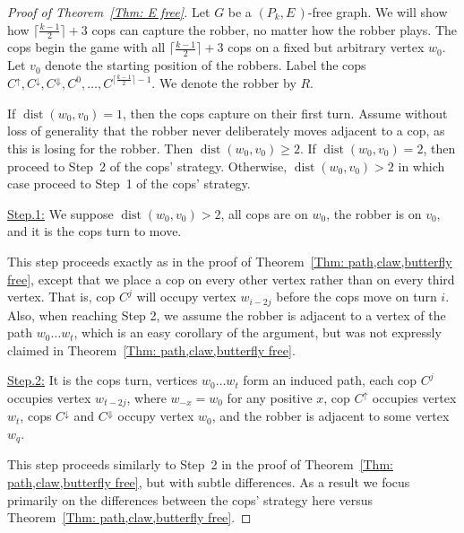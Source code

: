 \documentclass[12pt]{article}
\theoremstyle{definition}
\def\E{\textit{E}}
\DeclareMathOperator{\dist}{dist}
\begin{document}
\begin{proof}[Proof of Theorem~\ref{Thm: E free}]

Let $G$ be a $(P_k,\E\,)$-free graph.
We will show how  $\lceil\frac{k-1}{2}\rceil+3$ cops can capture the robber, no matter how the robber plays.
The cops begin the game with all $\lceil\frac{k-1}{2}\rceil+3$ cops on a fixed but arbitrary vertex $w_0$.
Let $v_0$ denote the starting position of the robbers.
Label the cops $C^\uparrow,C^\downarrow, C^\Downarrow, C^0,\dots, C^{\lceil\frac{k-1}{2}\rceil-1}$.
We denote the robber by $R$.

If $\dist(w_0,v_0) = 1$, then the cops capture on their first turn.
Assume without loss of generality that the robber never deliberately moves adjacent to a cop, as this is losing for the robber.
Then $\dist(w_0,v_0)\geq 2$.
If $\dist(w_0,v_0) = 2$, then proceed to Step~2 of the cops' strategy.
Otherwise, $\dist(w_0,v_0) > 2$ in which case proceed to Step~1 of the cops' strategy.

\vspace{0.25cm}
\noindent\underline{Step.1:} We suppose $\dist(w_0,v_0) > 2$, all cops are on $w_0$, the robber is on $v_0$, and it is the cops turn to move.
\vspace{0.25cm}

This step proceeds exactly as in the proof of Theorem~\ref{Thm: path,claw,butterfly free}, except that we place a cop on every other vertex rather than on every third vertex.
That is, cop $C^j$ will occupy vertex $w_{i-2j}$ before the cops move on turn $i$.
Also, when reaching Step 2, we assume the robber is adjacent to a vertex of the path $w_0\dots w_t$, which is an easy corollary of the argument,
but was not expressly claimed in Theorem~\ref{Thm: path,claw,butterfly free}.


\vspace{0.25cm}
\noindent\underline{Step.2:} It is the cops turn, vertices $w_0\dots w_t$ form an induced path, each cop $C^j$ occupies vertex $w_{t-2j}$, 
where $w_{-x} = w_0$ for any positive $x$, 
cop $C^\uparrow$ occupies vertex $w_t$,
cops $C^\downarrow$ and $C^\Downarrow$ occupy vertex $w_0$,
and the robber is adjacent to some vertex $w_q$.
\vspace{0.25cm}



This step proceeds similarly to Step~2 in the proof of Theorem~\ref{Thm: path,claw,butterfly free}, but with subtle differences.
As a result we focus primarily on the differences between the cops' strategy here versus Theorem~\ref{Thm: path,claw,butterfly free}.



\end{proof}
\end{document}
